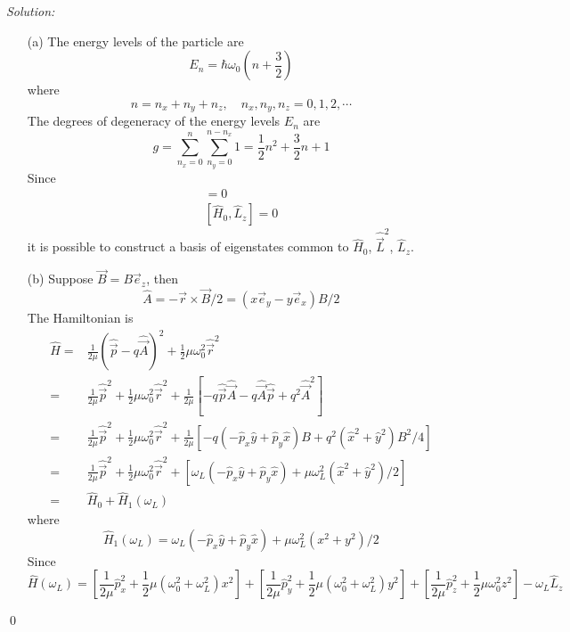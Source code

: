 \documentclass[10pt,a4paper]{article}
\newenvironment{sol}
    {\emph{Solution:}
    }
    {
    \qed
    }
\begin{document}
\begin{sol}
\begin{itemize}
\item[(a)] The energy levels of the particle are
\begin{equation}
E_n=\hbar\omega_0(n+\frac{3}{2})
\end{equation}
where
\begin{equation}
n=n_x+n_y+n_z,\quad n_x,n_y,n_z=0,1,2,\cdots
\end{equation}
The degrees of degeneracy of the energy levels $E_n$ are
\begin{equation}
g=\sum_{n_x=0}^n\sum_{n_y=0}^{n-n_x}1=\frac{1}{2}n^2+\frac{3}{2}n+1
\end{equation}
Since
\begin{gather}
[\hat{H}_0,\hat{\vec{L}}^2]=0\\
[\hat{H}_0,\hat{L}_z]=0
\end{gather}
it is possible to construct a basis of eigenstates common to $\hat{H}_0$, $\hat{\vec{L}}^2$, $\hat{L}_z$.
\item[(b)] Suppose $\vec{B}=B\vec{e}_z$, then
\begin{equation}
\hat{A}=-\vec{r}\times\vec{B}/2=(x\vec{e}_y-y\vec{e}_x)B/2
\end{equation}
The Hamiltonian is
\begin{align}
\nonumber\hat{H}=&\frac{1}{2\mu}(\hat{\vec{p}}-q\hat{\vec{A}})^2+\frac{1}{2}\mu\omega_0^2\hat{\vec{r}}^2\\
\nonumber=&\frac{1}{2\mu}\hat{\vec{p}}^2+\frac{1}{2}\mu\omega_0^2\hat{\vec{r}}^2+\frac{1}{2\mu}[-q\hat{\vec{p}}\hat{\vec{A}}-q\hat{\vec{A}}\hat{\vec{p}}+q^2\hat{\vec{A}}^2]\\
\nonumber=&\frac{1}{2\mu}\hat{\vec{p}}^2+\frac{1}{2}\mu\omega_0^2\hat{\vec{r}}^2+\frac{1}{2\mu}[-q(-\hat{p}_x\hat{y}+\hat{p}_y\hat{x})B+q^2(\hat{x}^2+\hat{y}^2)B^2/4]\\
\nonumber=&\frac{1}{2\mu}\hat{\vec{p}}^2+\frac{1}{2}\mu\omega_0^2\hat{\vec{r}}^2+[\omega_L(-\hat{p}_x\hat{y}+\hat{p}_y\hat{x})+\mu\omega_L^2(\hat{x}^2+\hat{y}^2)/2]\\
=&\hat{H}_0+\hat{H}_1(\omega_L)
\end{align}
where
\begin{equation}
\hat{H}_1(\omega_L)=\omega_L(-\hat{p}_x\hat{y}+\hat{p}_y\hat{x})+\mu\omega_L^2(x^2+y^2)/2
\end{equation}
Since
\begin{equation}
\hat{H}(\omega_L)=[\frac{1}{2\mu}\hat{p}_x^2+\frac{1}{2}\mu(\omega_0^2+\omega_L^2)x^2]+[\frac{1}{2\mu}\hat{p}_y^2+\frac{1}{2}\mu(\omega_0^2+\omega_L^2)y^2]+[\frac{1}{2\mu}\hat{p}_z^2+\frac{1}{2}\mu\omega_0^2z^2]-\omega_L\hat{L}_z

\end{equation}
\end{itemize}
\end{sol}
\end{document}
